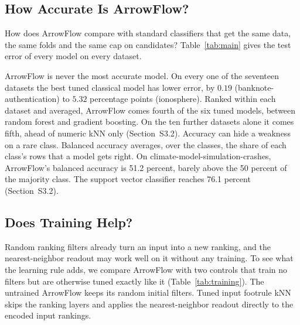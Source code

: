 \subsection{How Accurate Is ArrowFlow?}\label{sec:main-benchmark}

How does ArrowFlow compare with standard classifiers that get the same data, the same folds and the same cap on candidates? Table~\ref{tab:main} gives the test error of every model on every dataset.

ArrowFlow is never the most accurate model. On every one of the seventeen datasets the best tuned classical model has lower error, by $0.19$ (banknote-authentication) to $5.32$ percentage points (ionosphere). Ranked within each dataset and averaged, ArrowFlow comes fourth of the six tuned models, between random forest and gradient boosting. On the ten further datasets alone it comes fifth, ahead of numeric kNN only (Section~S3.2). Accuracy can hide a weakness on a rare class. Balanced accuracy averages, over the classes, the share of each class's rows that a model gets right. On climate-model-simulation-crashes, ArrowFlow's balanced accuracy is 51.2 percent, barely above the 50 percent of the majority class. The support vector classifier reaches 76.1 percent (Section~S3.2).



\subsection{Does Training Help?}\label{sec:training-controls}

Random ranking filters already turn an input into a new ranking, and the nearest-neighbor readout may work well on it without any training. To see what the learning rule adds, we compare ArrowFlow with two controls that train no filters but are otherwise tuned exactly like it (Table~\ref{tab:training}). The untrained ArrowFlow keeps its random initial filters. Tuned input footrule kNN skips the ranking layers and applies the nearest-neighbor readout directly to the encoded input rankings.



